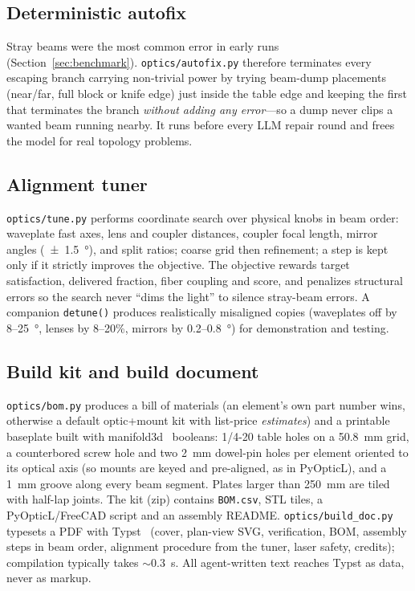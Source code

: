 \documentclass[10pt,twocolumn,letterpaper]{article}
\newcommand{\code}[1]{\texttt{\small #1}}
\begin{document}
\subsection{Deterministic autofix}
\label{sec:autofix}
Stray beams were the most common error in early runs (Section~\ref{sec:benchmark}). \code{optics/autofix.py} therefore terminates every escaping branch carrying non-trivial power by trying beam-dump placements (near/far, full block or knife edge) just inside the table edge and keeping the first that terminates the branch \emph{without adding any error}---so a dump never clips a wanted beam running nearby. It runs before every LLM repair round and frees the model for real topology problems.

\subsection{Alignment tuner}
\code{optics/tune.py} performs coordinate search over physical knobs in beam order: waveplate fast axes, lens and coupler distances, coupler focal length, mirror angles (\SI{\pm1.5}{\degree}), and split ratios; coarse grid then refinement; a step is kept only if it strictly improves the objective. The objective rewards target satisfaction, delivered fraction, fiber coupling and score, and penalizes structural errors so the search never ``dims the light'' to silence stray-beam errors. A companion \code{detune()} produces realistically misaligned copies (waveplates off by 8--\SI{25}{\degree}, lenses by 8--20\%, mirrors by 0.2--\SI{0.8}{\degree}) for demonstration and testing.

\subsection{Build kit and build document}
\label{sec:build}
\code{optics/bom.py} produces a bill of materials (an element's own part number wins, otherwise a default optic+mount kit with list-price \emph{estimates}) and a printable baseplate built with manifold3d~\cite{manifold} booleans: 1/4-20 table holes on a \SI{50.8}{\milli\metre} grid, a counterbored screw hole and two \SI{2}{\milli\metre} dowel-pin holes per element oriented to its optical axis (so mounts are keyed and pre-aligned, as in PyOpticL), and a \SI{1}{\milli\metre} groove along every beam segment. Plates larger than \SI{250}{\milli\metre} are tiled with half-lap joints. The kit (zip) contains \code{BOM.csv}, STL tiles, a PyOpticL/FreeCAD script and an assembly README. \code{optics/build\_doc.py} typesets a PDF with Typst~\cite{typst} (cover, plan-view SVG, verification, BOM, assembly steps in beam order, alignment procedure from the tuner, laser safety, credits); compilation typically takes $\sim$\SI{0.3}{\second}. All agent-written text reaches Typst as data, never as markup.
\end{document}
